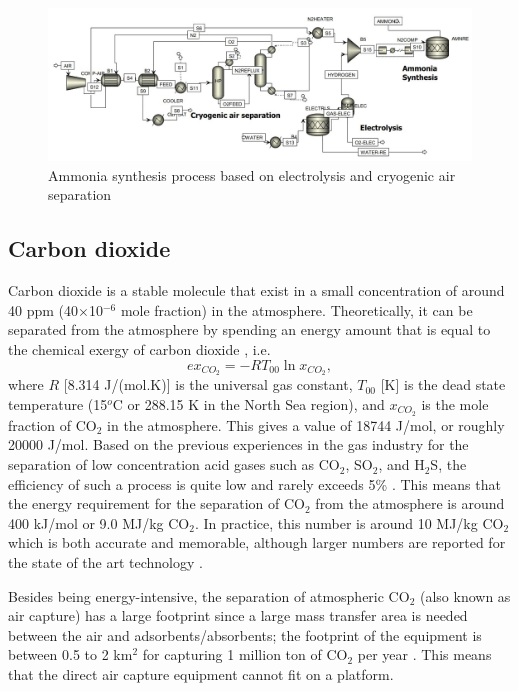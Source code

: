 \documentclass{ECOS_2021}
\begin{document}
\begin{figure}[H]
\centering
\includegraphics[width=14cm]{ammonia_cryogenic}

\caption{\label{fig:Ammonia-synthesis-cryogenic}Ammonia synthesis process
based on electrolysis and cryogenic air separation}
\end{figure}


\sffamily \subsection{Carbon dioxide}
\normalsize
Carbon dioxide is a stable molecule that exist in a small concentration
of around 40 ppm (40$\times$10$^{-6}$ mole fraction) in the atmosphere.
Theoretically, it can be separated from the atmosphere by spending
an energy amount that is equal to the chemical exergy of carbon dioxide
\cite{sankaranarayananEfficiencySustainabilityEnergy2010}, i.e.
\[
ex_{CO_{2}}=-RT_{00}\ln x_{CO_{2}},
\]
where $R$ {[}8.314 J/(mol.K){]} is the universal gas constant, $T_{00}$
{[}K{]} is the dead state temperature (15$^{o}$C or 288.15 K in the
North Sea region), and $x_{CO_{2}}$ is the mole fraction of CO$_{2}$
in the atmosphere. This gives a value of 18744 J/mol, or roughly 20000
J/mol. Based on the previous experiences in the gas industry for the
separation of low concentration acid gases such as CO$_{2}$, SO$_{2}$,
and H$_{2}$S, the efficiency of such a process is quite low and rarely
exceeds 5\% \cite{keithWhyCaptureCO22009a,mahmoudkhaniLowenergySodiumHydroxide2009}.
This means that the energy requirement for the separation of CO$_{2}$
from the atmosphere is around 400 kJ/mol or 9.0 MJ/kg CO$_{2}$. In
practice, this number is around 10 MJ/kg CO$_{2}$ which is both accurate
and memorable, although larger numbers are reported for the state
of the art technology \cite{internationalenergyagencyDirectAirCapture}.

Besides being energy-intensive, the separation of atmospheric CO$_{2}$
(also known as air capture) has a large footprint since a large mass
transfer area is needed between the air and adsorbents/absorbents;
the footprint of the equipment is between 0.5 to 2 km$^{2}$ for capturing
1 million ton of CO$_{2}$ per year \cite{DirectAirCapture2021,mcqueenCostAnalysisDirect2020}.
This means that the direct air capture equipment cannot fit on a platform.
\end{document}
